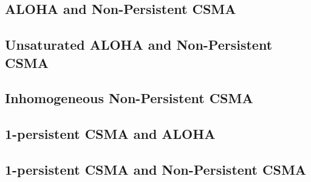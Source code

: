 \subsection{ALOHA and Non-Persistent CSMA}

\subsection{Unsaturated ALOHA and Non-Persistent CSMA}

\subsection{Inhomogeneous Non-Persistent CSMA }

\subsection{1-persistent CSMA and ALOHA}

\subsection{1-persistent CSMA and Non-Persistent CSMA}